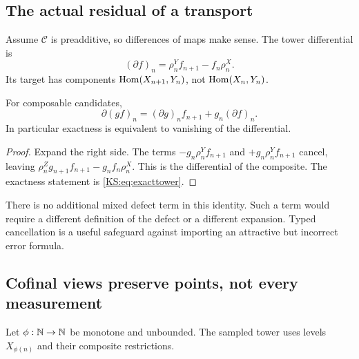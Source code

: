 \subsection{The actual residual of a transport}
Assume \(\mathcal C\) is preadditive, so differences of maps make sense. The tower differential is
\[
 (\partial f)_n=\rho^Y_nf_{n+1}-f_n\rho^X_n.
\]
Its target has components \(\operatorname{Hom}(X_{n+1},Y_n)\), not \(\operatorname{Hom}(X_n,Y_n)\).

\begin{KSproposition}\label{KS:KS17}
For composable candidates,
\[
 \partial(gf)_n=(\partial g)_nf_{n+1}+g_n(\partial f)_n.
\]
In particular exactness is equivalent to vanishing of the differential.
\end{KSproposition}
\begin{proof}
Expand the right side. The terms \(-g_n\rho^Y_nf_{n+1}\) and \(+g_n\rho^Y_nf_{n+1}\) cancel, leaving \(\rho^Z_ng_{n+1}f_{n+1}-g_nf_n\rho^X_n\). This is the differential of the composite. The exactness statement is \eqref{KS:eq:exacttower}.
\end{proof}
There is no additional mixed defect term in this identity. Such a term would require a different definition of the defect or a different expansion. Typed cancellation is a useful safeguard against importing an attractive but incorrect error formula.

\subsection{Cofinal views preserve points, not every measurement}
Let \(\phi:\mathbb N\to\mathbb N\) be monotone and unbounded. The sampled tower uses levels \(X_{\phi(n)}\) and their composite restrictions.

